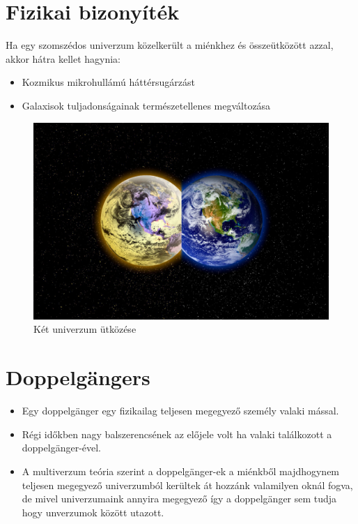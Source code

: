 \documentclass[11pt]{beamer}
\begin{document}
	\section{Fizikai bizonyíték}
	\transdissolve
	\begin{frame}
		\begin{multicols}{2}
			Ha egy szomszédos univerzum közelkerült a miénkhez és összeütközött azzal, akkor hátra kellet hagynia:
			\begin{itemize}
				\item Kozmikus mikrohullámú háttérsugárzást
				\item Galaxisok tuljadonságainak természetellenes megváltozása
			\end{itemize}
			\vfill\null
			\columnbreak
			\begin{figure}
				\centering
				\caption{Két univerzum ütközése}
				\includegraphics[scale=0.07]{utkozes.jpeg}
			\end{figure}
		\end{multicols}
	\end{frame}
	
	\section{Doppelgängers}
	\transdissolve
	\begin{frame}
		\begin{itemize}
		 \item<1-> Egy doppelgänger egy fizikailag teljesen megegyező személy valaki mással.
		 \item<2-> Régi időkben nagy balszerencsének az előjele volt ha valaki találkozott a doppelgänger-ével.
		 \item<3-> A multiverzum teória szerint a doppelgänger-ek a miénkből majdhogynem teljesen megegyező univerzumból kerültek át hozzánk valamilyen oknál fogva, de mivel univerzumaink annyira megegyező így a doppelgänger sem tudja hogy unverzumok között utazott.
		\end{itemize}
	\end{frame}
	
\end{document}
